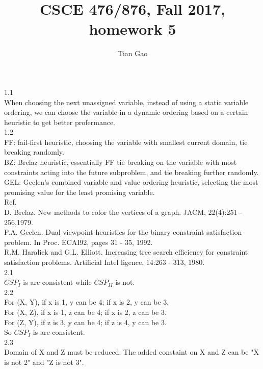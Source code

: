 \documentclass[a4paper]{article}
\title{CSCE 476/876, Fall 2017, homework 5}
\author{Tian Gao}
\begin{document}
\maketitle


1.1\\
When choosing the next unassigned variable, instead of using a static variable ordering, we can choose the variable in a dynamic ordering based on a certain heuristic to get better profermance.\\

1.2\\
FF: fail-first heuristic, choosing the variable with smallest current domain, tie breaking randomly.\\
BZ: Brelaz heuristic, essentially FF tie breaking on the variable with most constraints acting into the future subproblem, and tie breaking further randomly.\\
GEL: Geelen's combined variable and value ordering heuristic, selecting the most promising value for the least promising variable.\\
Ref.\\
D. Brelaz. New methods to color the vertices of a graph. JACM, 22(4):251 - 256,1979.\\
P.A. Geelen. Dual viewpoint heuristics for the binary constraint satisfaction problem. In Proc. ECAI92, pages 31 - 35, 1992.\\
R.M. Haralick and G.L. Elliott. Increasing tree search efficiency for constraint satisfaction problems. Artificial Intel ligence, 14:263 - 313, 1980.\\

2.1\\
$CSP_I$ is arc-consistent while $CSP_{II}$ is not.\\

2.2\\
For (X, Y), if x is 1, y can be 4; if x is 2, y can be 3.\\
For (X, Z), if x is 1, z can be 4; if x is 2, z can be 3.\\
For (Z, Y), if z is 3, y can be 4; if z is 4, y can be 3.\\
So $CSP_I$ is arc-consistent.\\

2.3\\
Domain of X and Z must be reduced. The added constaint on X and Z can be "X is not 2" and "Z is not 3".\\
\end{document}
